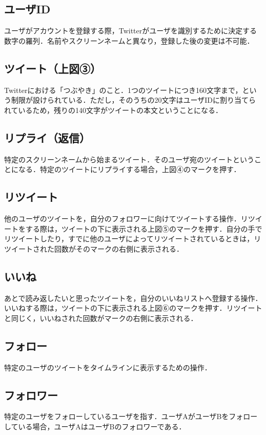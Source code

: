 \subsection{ユーザID}
ユーザがアカウントを登録する際，Twitterがユーザを識別するために決定する数字の羅列．名前やスクリーンネームと異なり，登録した後の変更は不可能．

\subsection{ツイート（上図③）}
Twitterにおける「つぶやき」のこと．1つのツイートにつき160文字まで，という制限が設けられている．ただし，そのうちの20文字はユーザIDに割り当てられているため，残りの140文字がツイートの本文ということになる．

\subsection{リプライ（返信）}
特定のスクリーンネームから始まるツイート．そのユーザ宛のツイートということになる．特定のツイートにリプライする場合，上図④のマークを押す．

\subsection{リツイート}
他のユーザのツイートを，自分のフォロワーに向けてツイートする操作．リツイートをする際は，ツイートの下に表示される上図⑤のマークを押す．自分の手でリツイートしたり，すでに他のユーザによってリツイートされているときは，リツイートされた回数がそのマークの右側に表示される．

\subsection{いいね}
あとで読み返したいと思ったツイートを，自分のいいねリストへ登録する操作．いいねする際は，ツイートの下に表示される上図⑥のマークを押す．リツイートと同じく，いいねされた回数がマークの右側に表示される．

\subsection{フォロー}
特定のユーザのツイートをタイムラインに表示するための操作．

\subsection{フォロワー}
特定のユーザをフォローしているユーザを指す．ユーザAがユーザBをフォローしている場合，ユーザAはユーザBのフォロワーである．

